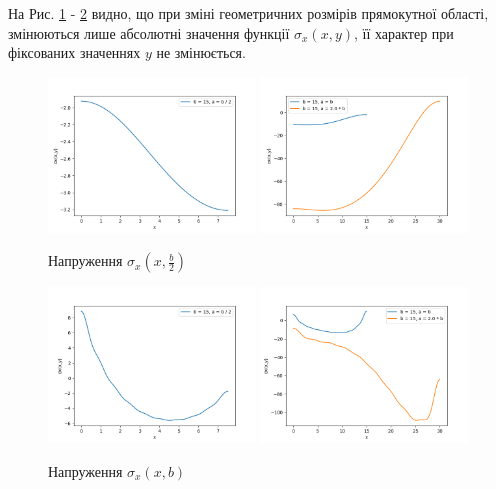 На Рис. \ref{static_1_sigma_x(x,b:2)} - \ref{static_1_sigma_x(x,b)} видно, що при зміні геометричних розмірів прямокутної області,
змінюються лише абсолютні значення функції $\sigma_x(x, y)$, її характер при фіксованих значеннях $y$ не змінюється.
\begin{figure}[h!]
    \begin{center}
        \includegraphics[width=0.49\textwidth, scale=1]{images/results/static_1/sigma_x(x,b:2)1.png}
        \includegraphics[width=0.49\textwidth, scale=1]{images/results/static_1/sigma_x(x,b:2)2.png}
        \caption{Напруження $\sigma_x(x, \frac{b}{2})$}\label{static_1_sigma_x(x,b:2)}
    \end{center}
\end{figure}

\begin{figure}[h!]
    \begin{center}
        \includegraphics[width=0.49\textwidth, scale=1]{images/results/static_1/sigma_x(x,b)1.png}
        \includegraphics[width=0.49\textwidth, scale=1]{images/results/static_1/sigma_x(x,b)2.png}
        \caption{Напруження $\sigma_x(x, b)$}\label{static_1_sigma_x(x,b)}
    \end{center}
\end{figure}

